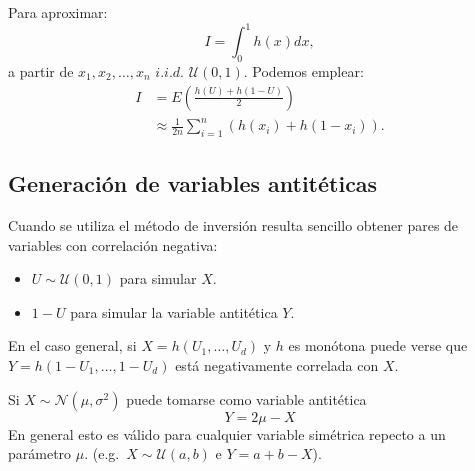 \documentclass[
  10pt,
]{book}
\theoremstyle{break}
\theoremstyle{nonumberplain}
\begin{document}
Para aproximar:
\[I=\int_{0}^{1}h\left(  x\right) dx,\]
a partir de \(x_{1},x_{2},\ldots,x_{n}\) \(i.i.d.\)
\(\mathcal{U}\left(0,1\right)\).
Podemos emplear:
\[\begin{aligned}
    I  & =E\left(  \frac{h\left(  U\right)  +h\left(  1-U\right)  }{2}\right) \\
    & \approx \frac{1}{2n}\sum \limits_{i=1}^{n}\left(  h\left(  x_{i}\right)
    +h\left(  1-x_{i}\right)  \right).
\end{aligned}\]

\hypertarget{generaciuxf3n-de-variables-antituxe9ticas}{%
\subsection{Generación de variables antitéticas}\label{generaciuxf3n-de-variables-antituxe9ticas}}

Cuando se utiliza el método de inversión resulta sencillo obtener
pares de variables con correlación negativa:

\begin{itemize}
\item
  \(U\sim \mathcal{U}\left( 0,1\right)\) para simular \(X\).
\item
  \(1-U\) para simular la variable antitética \(Y\).
\end{itemize}

En el caso general, si \(X=h\left( U_{1},\ldots,U_{d}\right)\) y
\(h\) es monótona puede verse \citep[e.g.][]{ross1999} que
\(Y=h\left( 1-U_{1},\ldots,1-U_{d}\right)\) está negativamente
correlada con \(X\).

Si \(X\sim \mathcal{N}(\mu,\sigma^2)\) puede tomarse como variable
antitética \[Y=2\mu-X\]
En general esto es válido para cualquier variable
simétrica repecto a un parámetro \(\mu\).
(e.g.~\(X\sim \mathcal{U}(a,b)\) e \(Y=a+b-X\)).
\end{document}
